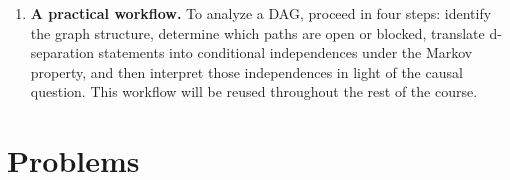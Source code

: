 \documentclass[master.tex]{subfiles}
\begin{document}
\begin{enumerate}
  \item \textbf{A practical workflow.}
        To analyze a DAG, proceed in four steps: identify the graph
        structure, determine which paths are open or blocked, translate
        d-separation statements into conditional independences under the
        Markov property, and then interpret those independences in light
        of the causal question.  This workflow will be reused throughout
        the rest of the course.
\end{enumerate}

\newpage
\section*{Problems}
\end{document}
